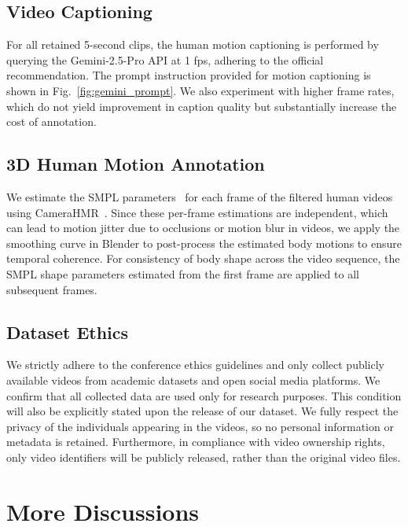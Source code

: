 \subsection{Video Captioning}
\label{sec:stage3}

For all retained 5-second clips, the human motion captioning is performed by querying the Gemini-2.5-Pro API at 1 fps, adhering to the official recommendation. The prompt instruction provided for motion captioning is shown in Fig.~\ref{fig:gemini_prompt}. We also experiment with higher frame rates, which do not yield improvement in caption quality but substantially increase the cost of annotation.

\subsection{3D Human Motion Annotation}
\label{sec:stage4}

We estimate the SMPL parameters~\cite{loper2023smpl} for each frame of the filtered human videos using CameraHMR~\cite{patel2025camerahmr}. Since these per-frame estimations are independent, which can lead to motion jitter due to occlusions or motion blur in videos, we apply the smoothing curve in Blender to post-process the estimated body motions to ensure temporal coherence. For consistency of body shape across the video sequence, the SMPL shape parameters estimated from the first frame are applied to all subsequent frames.

\subsection{Dataset Ethics}
\label{sec:data_ethics}
We strictly adhere to the conference ethics guidelines and only collect publicly available videos from academic datasets and open social media platforms. We confirm that all collected data are used only for research purposes. This condition will also be explicitly stated upon the release of our dataset. We fully respect the privacy of the individuals appearing in the videos, so no personal information or metadata is retained. Furthermore, in compliance with video ownership rights, only video identifiers will be publicly released, rather than the original video files.

\section{More Discussions}

